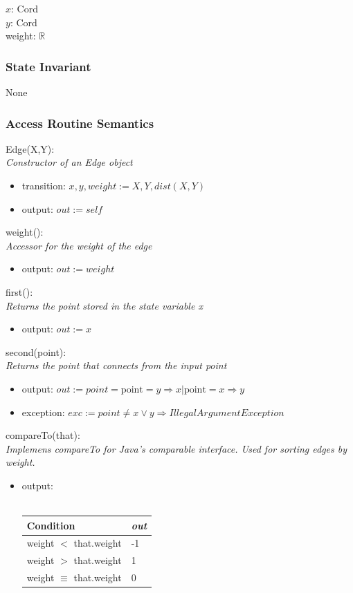 \documentclass[12pt]{article}
\begin{document}
$x$: Cord\\
$y$: Cord\\
weight: $\mathbb{R}$

\subsubsection* {State Invariant}

None

\subsubsection* {Access Routine Semantics}

Edge(X,Y):\\
\textit{Constructor of an Edge object}
\begin{itemize}
\item transition: $x, y, weight := X, Y, dist(X,Y)$
\item output: $out := \mathit{self}$
\end{itemize}

\noindent
weight():\\
\textit{Accessor for the weight of the edge}
\begin{itemize}
\item output: $out := weight$
\end{itemize}

\noindent
first():\\
\textit{Returns the point stored in the state variable x}
\begin{itemize}
\item output: $out := x$
\end{itemize}

\noindent
second(point):\\
\textit{Returns the point that connects from the input point}
\begin{itemize}
\item output: $out := point = \mbox{point} = y \Rightarrow x | \mbox{point} = x \Rightarrow y$
\item exception: $exc := point \neq x \lor y \Rightarrow IllegalArgumentException$
\end{itemize}

\noindent
compareTo(that):\\
\textit{Implemens compareTo for Java's comparable interface. Used for sorting edges by weight.}
\begin{itemize}
\item output: \\\\
\begin{tabular}{| l | l |}
\hline
\textbf{Condition} & \textit{out}\\
\hline
weight $<$ that.weight & -1 \\
\hline
weight $>$ that.weight & 1 \\
\hline
weight $\equiv$ that.weight & 0 \\
\hline
\end{tabular}
\end{itemize}
\end{document}
